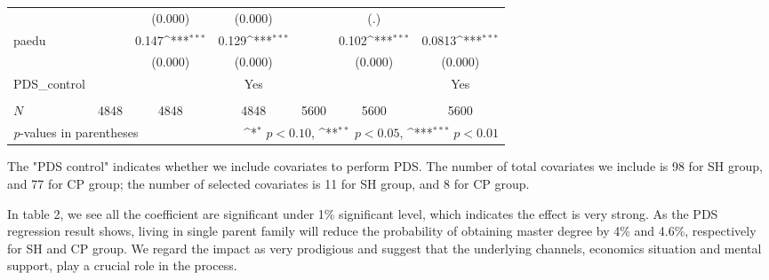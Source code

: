 \documentclass[]{AEA}
\def\sym#1{\ifmmode^{#1}\else\(^{#1}\)\fi}
\begin{document}
\begin{center}
\begin{table}
\begin{tabular}{l*{6}c}
                &                     &     (0.000)         &     (0.000)         &                     &         (.)         &                     \\
    [1em]
    paedu       &                     &       0.147\sym{***}&       0.129\sym{***}&                     &       0.102\sym{***}&      0.0813\sym{***}\\
            &                     &     (0.000)         &     (0.000)         &                     &     (0.000)         &     (0.000)         \\
    [1em]
    PDS\_control  &   &  &  Yes    &  &    &  Yes \\
    &   &      &      &   &      &      \\
    \hline
    \(N\)       &        4848         &        4848         &        4848         &        5600         &        5600         &        5600         \\
    \bottomrule
    \multicolumn{3}{l}{\footnotesize \textit{p}-values in parentheses} & \multicolumn{4}{r}{\footnotesize \sym{*} \(p<0.10\), \sym{**} \(p<0.05\), \sym{***} \(p<0.01\)}\\
    \end{tabular}
    \begin{tablenotes}
        The "PDS control" indicates whether we include covariates to perform PDS.  The number of total covariates we include is 98 for SH group, and 77 for CP group; the number of selected covariates is 11 for SH group, and 8 for CP group.
    \end{tablenotes}
    \end{table}
    \end{center}

    In table 2, we see all the coefficient are significant under 1\% significant level, which indicates the effect is very strong.  As the PDS regression result shows, living in single parent family will reduce the probability of obtaining master degree by 4\% and 4.6\%, respectively for SH and CP group.  We regard the impact as very prodigious and suggest that the underlying channels, economics situation and mental support, play a crucial role in the process.
\end{document}
